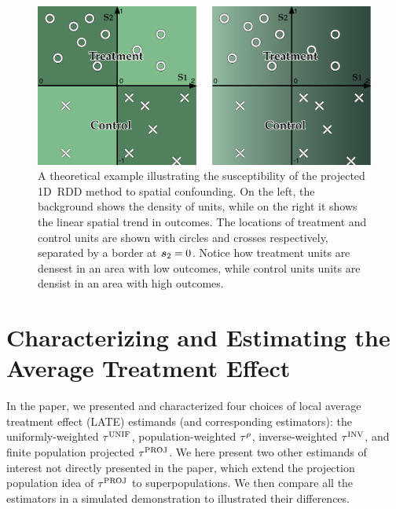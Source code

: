 \documentclass[letter,12pt]{article}
\begin{document}
\begin{figure}[tbp]
    \centering
    \includegraphics[height=0.35\textheight]{figures/confounding/confounding.pdf}
    \caption{
        A theoretical example illustrating the susceptibility of the projected 1D~RDD method to spatial confounding. 
        On the left, the background shows the density of units, while on the right it shows the linear spatial trend in outcomes.
        The locations of treatment and control units are shown with circles and crosses respectively, separated by a border at \(\bm{s}_2 = 0\). 
        Notice how treatment units are densest in an area with low outcomes, while control units units are densist in an area with high outcomes.
        \label{fig:confounding}}
\end{figure}

\section{Characterizing and Estimating the Average Treatment Effect}

In the paper, we presented and characterized four choices of local average treatment effect (LATE) estimands (and corresponding estimators): the uniformly-weighted $\tau^{\mathrm{UNIF}}$, population-weighted $\tau^{\rho}$, inverse-weighted $\tau^{\mathrm{INV}}$, and finite population projected $\tau^{\mathrm{PROJ}}$.
We here present two other estimands of interest not directly presented in the paper, which extend the projection population idea of $\tau^{\mathrm{PROJ}}$ to superpopulations.
We then compare all the estimators in a simulated demonstration to illustrated their differences.
\end{document}
